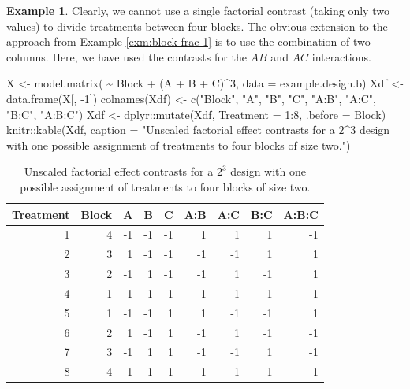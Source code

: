 \documentclass[
]{book}
\newenvironment{Shaded}{\begin{snugshade}}{\end{snugshade}}
\newcommand{\AttributeTok}[1]{\textcolor[rgb]{0.77,0.63,0.00}{#1}}
\newcommand{\DecValTok}[1]{\textcolor[rgb]{0.00,0.00,0.81}{#1}}
\newcommand{\FunctionTok}[1]{\textcolor[rgb]{0.00,0.00,0.00}{#1}}
\newcommand{\NormalTok}[1]{#1}
\newcommand{\OtherTok}[1]{\textcolor[rgb]{0.56,0.35,0.01}{#1}}
\newcommand{\SpecialCharTok}[1]{\textcolor[rgb]{0.00,0.00,0.00}{#1}}
\newcommand{\StringTok}[1]{\textcolor[rgb]{0.31,0.60,0.02}{#1}}
\theoremstyle{definition}
\theoremstyle{definition}
\newtheorem{example}{Example}[chapter]
\theoremstyle{definition}
\theoremstyle{definition}
\theoremstyle{remark}
\begin{document}
\begin{example}
Clearly, we cannot use a single factorial contrast (taking only two values) to divide treatments between four blocks. The obvious extension to the approach from Example \ref{exm:block-frac-1} is to use the combination of two columns. Here, we have used the contrasts for the \(AB\) and \(AC\) interactions.

\begin{Shaded}
\begin{Highlighting}[]
\NormalTok{X }\OtherTok{\textless{}{-}} \FunctionTok{model.matrix}\NormalTok{( }\SpecialCharTok{\textasciitilde{}}\NormalTok{ Block }\SpecialCharTok{+}\NormalTok{ (A }\SpecialCharTok{+}\NormalTok{ B }\SpecialCharTok{+}\NormalTok{ C)}\SpecialCharTok{\^{}}\DecValTok{3}\NormalTok{, }\AttributeTok{data =}\NormalTok{ example.design.b)}
\NormalTok{Xdf }\OtherTok{\textless{}{-}} \FunctionTok{data.frame}\NormalTok{(X[, }\SpecialCharTok{{-}}\DecValTok{1}\NormalTok{])}
\FunctionTok{colnames}\NormalTok{(Xdf) }\OtherTok{\textless{}{-}} \FunctionTok{c}\NormalTok{(}\StringTok{"Block"}\NormalTok{, }\StringTok{"A"}\NormalTok{, }\StringTok{"B"}\NormalTok{, }\StringTok{"C"}\NormalTok{, }\StringTok{"A:B"}\NormalTok{, }\StringTok{"A:C"}\NormalTok{, }\StringTok{"B:C"}\NormalTok{, }\StringTok{"A:B:C"}\NormalTok{)}
\NormalTok{Xdf }\OtherTok{\textless{}{-}}\NormalTok{ dplyr}\SpecialCharTok{::}\FunctionTok{mutate}\NormalTok{(Xdf, }\AttributeTok{Treatment =} \DecValTok{1}\SpecialCharTok{:}\DecValTok{8}\NormalTok{, }\AttributeTok{.before =}\NormalTok{ Block)}
\NormalTok{knitr}\SpecialCharTok{::}\FunctionTok{kable}\NormalTok{(Xdf, }\AttributeTok{caption =} \StringTok{"Unscaled factorial effect contrasts for a $2\^{}3$ design with one possible assignment of treatments to four blocks of size two."}\NormalTok{)}
\end{Highlighting}
\end{Shaded}

\begin{table}

\caption{\label{tab:block-frac-2-mm}Unscaled factorial effect contrasts for a $2^3$ design with one possible assignment of treatments to four blocks of size two.}
\centering
\begin{tabular}[t]{r|r|r|r|r|r|r|r|r}
\hline
Treatment & Block & A & B & C & A:B & A:C & B:C & A:B:C\\
\hline
1 & 4 & -1 & -1 & -1 & 1 & 1 & 1 & -1\\
\hline
2 & 3 & 1 & -1 & -1 & -1 & -1 & 1 & 1\\
\hline
3 & 2 & -1 & 1 & -1 & -1 & 1 & -1 & 1\\
\hline
4 & 1 & 1 & 1 & -1 & 1 & -1 & -1 & -1\\
\hline
5 & 1 & -1 & -1 & 1 & 1 & -1 & -1 & 1\\
\hline
6 & 2 & 1 & -1 & 1 & -1 & 1 & -1 & -1\\
\hline
7 & 3 & -1 & 1 & 1 & -1 & -1 & 1 & -1\\
\hline
8 & 4 & 1 & 1 & 1 & 1 & 1 & 1 & 1\\
\hline
\end{tabular}
\end{table}


\end{example}
\end{document}
